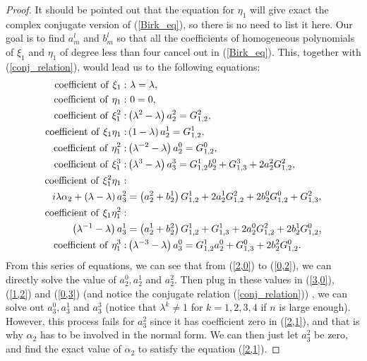 \documentclass{article}
\numberwithin{figure}{section}
\numberwithin{equation}{section}
\theoremstyle{remark}
\theoremstyle{definition}
\begin{document}
\begin{proof}
It should be pointed out that the equation for \(\eta_1\) will give 
exact the complex conjugate version of (\ref*{Birk_eq}), so there is no need to list
it here. Our goal is to find $a_m^l$ and $b_m^l$ so that all the coefficients of homogeneous polynomials of $\xi_1$ and $\eta_1$ of degree less than four cancel out in (\ref{Birk_eq}). This, together with (\ref{conj_relation}), would lead us to the following equations:
\begin{align}
    {\rm coefficient\ of\ } \xi_1: &\ \lambda=\lambda,\notag \\
	{\rm coefficient\ of\ } \eta_1:&\ 0=0,\notag \\
	\label{2,0} {\rm coefficient\ of\ }\xi_1^2:& \left(\lambda^2-\lambda\right)a_2^2=G_{1,2}^2,\\
	\label{1,1} {\rm coefficient\ of\ }\xi_1\eta_1:& \left(1-\lambda\right)a_2^1=G_{1,2}^1,\\
	\label{0,2} {\rm coefficient\ of\ }\eta_1^2:& \left(\lambda^{-2}-\lambda\right)a_2^0=G_{1,2}^0,\\
	\label{3,0} {\rm coefficient\ of\ }\xi_1^3:& \left(\lambda^3-\lambda\right)a_3^3=G_{1,2}^1b_2^0+G_{1,3}^3+2a_2^2G_{1,2}^2,\\
	\label{2,1} {\rm coefficient\ of\ } \xi_1^2\eta_1:&\\
	  i\lambda\alpha_{2} + \left(\lambda-\lambda \right)a_{3}^{2}&= \left( a_{2}^{2} + b_{2}^{1} \right)G_{1,2}^{1} +2a_2^1G_{1,2}^2+2b_2^0G_{1,2}^0+ G_{1,3}^{2},\\
    \label{1,2} {\rm coefficient\ of\ }\xi_1\eta_1^2:&\\
     \left(\lambda^{-1}-\lambda\right)a_3^1&= \left( a_{2}^{1} + b_{2}^{2} \right)G_{1,2}^{1}+G_{1,3}^1+2a_2^0G_{1,2}^2+2b_2^1G_{1,2}^0,\\
	\label{0,3} {\rm coefficient\ of\ } \eta_1^3:& \left(\lambda^{-3}-\lambda\right)a_3^0=G_{1,2}^1a_2^0+G_{1,3}^0+2b_2^2G_{1,2}^0.
\end{align}
From this series of equations, we can see that from (\ref{2,0}) to (\ref{0,2}), we can directly solve the value of $a_2^0,a_2^1$ and $a_2^2$. Then plug in these values in (\ref{3,0}), (\ref{1,2}) and (\ref{0,3}) (and notice the conjugate relation (\ref{conj_relation})) , we can solve out $a_3^0,a_3^1$ and $a_3^3$ (notice that \(\lambda^{k} \neq 1\) for \(k = 1,2,3,4\) if
\(n\) is large enough). However, this process fails for $a_3^2$ since it has coefficient zero in (\ref{2,1}), and that is why $\alpha_2$ has to be involved in the normal form. We can then just let $a_3^2$ be zero, and find the exact value of $\alpha_2$ to satisfy the equation (\ref{2,1}). 


\end{proof}
\end{document}

